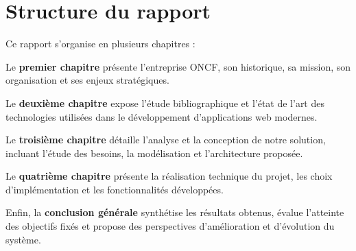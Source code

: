 \section*{Structure du rapport}

Ce rapport s'organise en plusieurs chapitres :

Le \textbf{premier chapitre} présente l'entreprise ONCF, son historique, sa mission, son organisation et ses enjeux stratégiques.

Le \textbf{deuxième chapitre} expose l'étude bibliographique et l'état de l'art des technologies utilisées dans le développement d'applications web modernes.

Le \textbf{troisième chapitre} détaille l'analyse et la conception de notre solution, incluant l'étude des besoins, la modélisation et l'architecture proposée.

Le \textbf{quatrième chapitre} présente la réalisation technique du projet, les choix d'implémentation et les fonctionnalités développées.

Enfin, la \textbf{conclusion générale} synthétise les résultats obtenus, évalue l'atteinte des objectifs fixés et propose des perspectives d'amélioration et d'évolution du système.

\vfill

\newpage